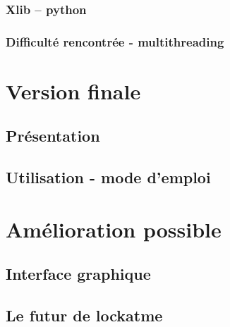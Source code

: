 \documentclass[french]{report}
\begin{document}
\subsection{Xlib – python}

\subsection{Difficulté rencontrée - multithreading}

\chapter{Version finale}

\newpage

\section{Présentation}

\section{Utilisation - mode d'emploi}

\chapter{Amélioration possible}

\newpage

\section{Interface graphique}

\section{Le futur de lockatme}
\end{document}
